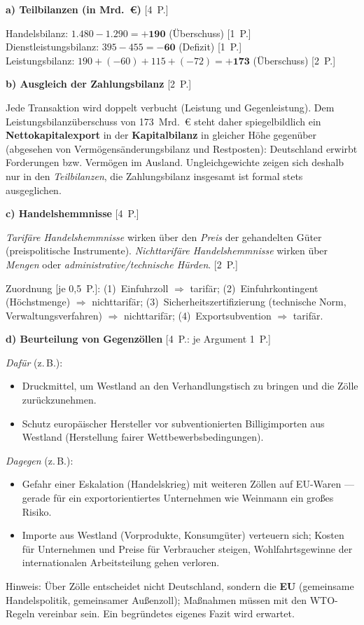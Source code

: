 \begin{loesung}[title={Lösung Aufgabe~3.7 --- Zahlungsbilanz und Handelskonflikt}]
\textbf{a) Teilbilanzen (in Mrd.~€)} \hfill [4~P.]

Handelsbilanz: $1.480 - 1.290 = \textbf{+190}$ (Überschuss) [1~P.]\\
Dienstleistungsbilanz: $395 - 455 = \textbf{$-$60}$ (Defizit) [1~P.]\\
Leistungsbilanz: $190 + (-60) + 115 + (-72) = \textbf{+173}$ (Überschuss) [2~P.]

\medskip
\textbf{b) Ausgleich der Zahlungsbilanz} \hfill [2~P.]

Jede Transaktion wird doppelt verbucht (Leistung und Gegenleistung). Dem
Leistungsbilanzüberschuss von 173~Mrd.~€ steht daher spiegelbildlich ein
\textbf{Nettokapitalexport} in der \textbf{Kapitalbilanz} in gleicher Höhe gegenüber
(abgesehen von Vermögensänderungsbilanz und Restposten): Deutschland erwirbt Forderungen
bzw. Vermögen im Ausland. Ungleichgewichte zeigen sich deshalb nur in den
\emph{Teilbilanzen}, die Zahlungsbilanz insgesamt ist formal stets ausgeglichen.

\medskip
\textbf{c) Handelshemmnisse} \hfill [4~P.]

\emph{Tarifäre Handelshemmnisse} wirken über den \emph{Preis} der gehandelten Güter
(preispolitische Instrumente). \emph{Nichttarifäre Handelshemmnisse} wirken über
\emph{Mengen} oder \emph{administrative/technische Hürden}. [2~P.]

Zuordnung [je 0,5~P.]: (1)~Einfuhrzoll $\Rightarrow$ tarifär; (2)~Einfuhrkontingent
(Höchstmenge) $\Rightarrow$ nichttarifär; (3)~Sicherheitszertifizierung (technische Norm,
Verwaltungsverfahren) $\Rightarrow$ nichttarifär; (4)~Exportsubvention $\Rightarrow$
tarifär.

\medskip
\textbf{d) Beurteilung von Gegenzöllen} \hfill [4~P.: je Argument 1~P.]

\emph{Dafür} (z.\,B.):
\begin{itemize}
  \item Druckmittel, um Westland an den Verhandlungstisch zu bringen und die Zölle
    zurückzunehmen.
  \item Schutz europäischer Hersteller vor subventionierten Billigimporten aus
    Westland (Herstellung fairer Wettbewerbsbedingungen).
\end{itemize}
\emph{Dagegen} (z.\,B.):
\begin{itemize}
  \item Gefahr einer Eskalation (Handelskrieg) mit weiteren Zöllen auf EU-Waren ---
    gerade für ein exportorientiertes Unternehmen wie Weinmann ein großes Risiko.
  \item Importe aus Westland (Vorprodukte, Konsumgüter) verteuern sich; Kosten für
    Unternehmen und Preise für Verbraucher steigen, Wohlfahrtsgewinne der
    internationalen Arbeitsteilung gehen verloren.
\end{itemize}
Hinweis: Über Zölle entscheidet nicht Deutschland, sondern die \textbf{EU} (gemeinsame
Handelspolitik, gemeinsamer Außenzoll); Maßnahmen müssen mit den WTO-Regeln vereinbar
sein. Ein begründetes eigenes Fazit wird erwartet.
\end{loesung}

